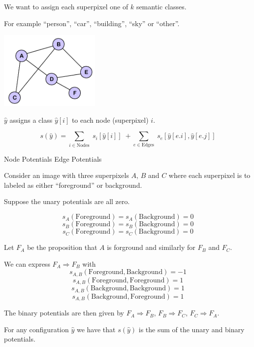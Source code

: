{\vfill
We want to assign each superpixel one of $k$ semantic classes.

\vfill
For example ``person'', ``car'', ``building'', ``sky'' or ``other''.



\centerline{\includegraphics[height= 1.5in]{../images/Graph}}

$\hat{y} $ assigns a class $\hat{y}[i]$ to each node (superpixel) $i$.


$$s(\hat{y}) = \sum_{i \in \mathrm{Nodes}}\; s_i[\hat{y}[i]]\; + \sum_{e \in \mathrm{Edges}}\;s_e[\hat{y}[e.i],\hat{y}[e.j]]$$

\vfill
\centerline{Node Potentials \hspace{4em}Edge Potentials}


Consider an image with three superpixels $A$, $B$ and $C$ where
each superpixel is to labeled as either ``foreground'' or background.

\vfill
Suppose the unary potentials are all zero.

\vfill
$$s_A(\mathrm{Foreground}) = s_A(\mathrm{Background}) = 0$$
$$s_B(\mathrm{Foreground}) = s_B(\mathrm{Background}) = 0$$
$$s_C(\mathrm{Foreground}) = s_C(\mathrm{Background}) = 0$$



\vfill
Let $F_A$ be the proposition that $A$ is forground and similarly for $F_B$ and $F_C$.

\vfill
We can express $F_A \Rightarrow F_B$ with
$$s_{A,B}(\mathrm{Foreground},\mathrm{Background}) = -1$$
$$s_{A,B}(\mathrm{Foreground},\mathrm{Foreground}) = 1$$
$$s_{A,B}(\mathrm{Background},\mathrm{Background}) = 1$$
$$s_{A,B}(\mathrm{Background},\mathrm{Foreground}) = 1$$

\vfill
The binary potentials are then given by
$F_A \Rightarrow F_B$, $F_B \Rightarrow F_C$, $F_C \Rightarrow F_A$.


For any configuration $\hat{y}$ we have that $s(\hat{y})$ is the sum of the unary and binary potentials.

}
